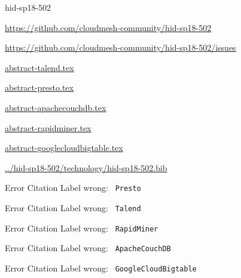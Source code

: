 \begin{IU}

hid-sp18-502

\url{https://github.com/cloudmesh-community/hid-sp18-502}

\url{https://github.com/cloudmesh-community/hid-sp18-502/issues}

\href{https://github.com/cloudmesh-community/hid-sp18-502/blob/master//technology/abstract-talend.tex}{abstract-talend.tex}

\href{https://github.com/cloudmesh-community/hid-sp18-502/blob/master//technology/abstract-presto.tex}{abstract-presto.tex}

\href{https://github.com/cloudmesh-community/hid-sp18-502/blob/master//technology/abstract-apachecouchdb.tex}{abstract-apachecouchdb.tex}

\href{https://github.com/cloudmesh-community/hid-sp18-502/blob/master//technology/abstract-rapidminer.tex}{abstract-rapidminer.tex}

\href{https://github.com/cloudmesh-community/hid-sp18-502/blob/master//technology/abstract-googlecloudbigtable.tex}{abstract-googlecloudbigtable.tex}

\href{https://github.com/cloudmesh-community/hid-sp18-502/blob/master//technology/hid-sp18-502.bib}{../hid-sp18-502/technology/hid-sp18-502.bib}

 Error Citation Label wrong: \verb| Presto |

 Error Citation Label wrong: \verb| Talend |

 Error Citation Label wrong: \verb| RapidMiner |

 Error Citation Label wrong: \verb| ApacheCouchDB |

 Error Citation Label wrong: \verb| GoogleCloudBigtable |

\end{IU}


